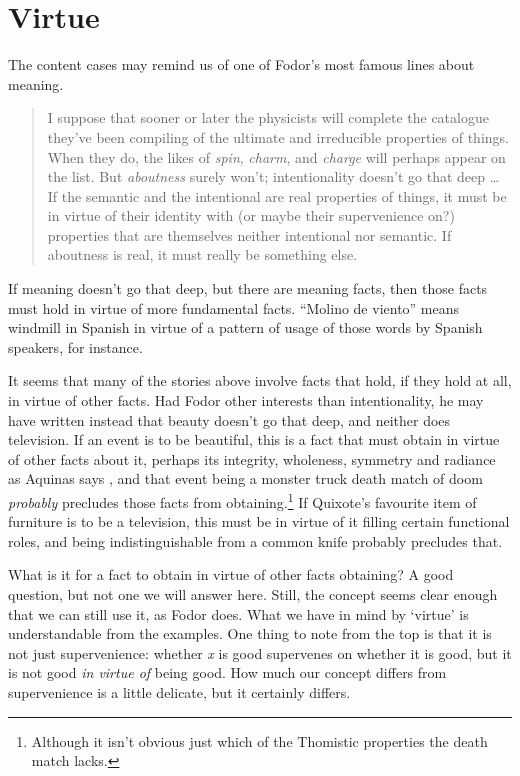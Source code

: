 \section{Virtue}
The content cases may remind us of one of Fodor's most famous lines about meaning.

\begin{quote}
\begin{sloppypar}
I suppose that sooner or later the physicists will complete the catalogue they've been compiling of the ultimate and irreducible properties of things. When they do, the likes of \textit{spin}, \textit{charm}, and \textit{charge} will perhaps appear on the list. But \textit{aboutness} surely won't; intentionality doesn't go that deep {\dots} If the semantic and the intentional are real properties of things, it must be in virtue of their identity with (or maybe their supervenience on?) properties that are themselves neither intentional nor semantic. If aboutness is real, it must really be something else. \cite[97]{Fodor1987}
\end{sloppypar}
\end{quote}

\noindent If meaning doesn't go that deep, but there are meaning facts, then those facts must hold in virtue of more fundamental facts. ``Molino de viento'' means windmill in Spanish in virtue of a pattern of usage of those words by Spanish speakers, for instance.

It seems that many of the stories above involve facts that hold, if they hold at all, in virtue of other facts. Had Fodor other interests than intentionality, he may have written instead that beauty doesn't go that deep, and neither does television. If an event is to be beautiful, this is a fact that must obtain in virtue of other facts about it, perhaps its integrity, wholeness, symmetry and radiance as Aquinas says \cite[212]{Joyce1944}, and that event being a monster truck death match of doom \textit{probably} precludes those facts from obtaining.\footnote{Although it isn't obvious just which of the Thomistic properties the death match lacks.} If Quixote's favourite item of furniture is to be a television, this must be in virtue of it filling certain functional roles, and being indistinguishable from a common knife probably precludes that.

What is it for a fact to obtain in virtue of other facts obtaining? A good question, but not one we will answer here. Still, the concept seems clear enough that we can still use it, as Fodor does. What we have in mind by `virtue' is understandable from the examples. One thing to note from the top is that it is not just supervenience: whether \textit{x} is good supervenes on whether it is good, but it is not good \textit{in virtue of }being good. How much our concept differs from supervenience is a little delicate, but it certainly differs.

